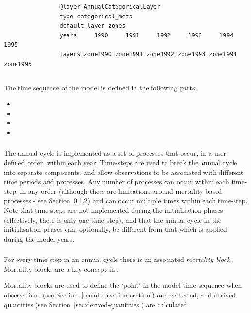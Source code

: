 \begin{enumerate}
\begin{enumerate}
		{\small{\begin{verbatim}
				@layer AnnualCategoricalLayer
				type categorical_meta
				default_layer zones
				years     1990     1991     1992     1993     1994     1995
				layers zone1990 zone1991 zone1992 zone1993 zone1994 zone1995
				\end{verbatim}}}
	\end{enumerate}
\end{enumerate}
\subsection{}

The time sequence of the model is defined in the following parts;
\begin{itemize}
  \item {}
  \item {}
  \item {}
  \item {}
\end{itemize}

\subsubsection{}
The annual cycle is implemented as a set of processes that occur, in a user-defined order, within each year. Time-steps are used to break the annual cycle into separate components, and allow observations to be associated with different time periods and processes. Any number of processes can occur within each time-step, in any order (although there are limitations around mortality based processes - see Section~\ref{sec:mortality_block}) and can occur multiple times within each time-step. Note that time-steps are not implemented during the initialisation phases (effectively, there is only one time-step), and that the annual cycle in the initialisation phases can, optionally, be different from that which is applied during the model years.

\subsubsection{}\label{sec:mortality_block}

For every time step in an annual cycle there is an associated \emph{mortality block}. Mortality blocks are a key concept in \IBM.

Mortality blocks are used to define the `point' in the model time sequence when observations (see Section~\ref{sec:observation-section}) are evaluated, and derived quantities (see Section~\ref{sec:derived-quantities}) are calculated.


